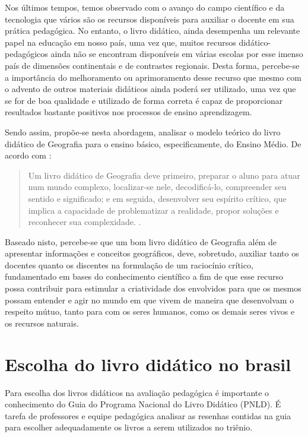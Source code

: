 \begin{refsection}
    Nos últimos tempos, temos observado com o avanço do campo científico e da tecnologia que vários são os recursos disponíveis para auxiliar o docente em sua prática pedagógica. No entanto, o livro didático, ainda desempenha um relevante papel na educação em nosso país, uma vez que, muitos recursos didático-pedagógicos ainda não se encontram disponíveis em várias escolas por esse imenso país de dimensões continentais e de contrastes regionais. Desta forma, percebe-se a importância do melhoramento ou aprimoramento desse recurso que mesmo com o advento de outros materiais didáticos ainda poderá ser utilizado, uma vez que se for de boa qualidade e utilizado de forma correta é capaz de proporcionar resultados bastante positivos nos processos de ensino aprendizagem.  

    Sendo assim, propõe-se nesta abordagem, analisar o modelo teórico do livro didático de Geografia para o ensino básico, especificamente, do Ensino Médio. De acordo com \textcite{HESPANHOL2006Avaliação}:
    
    \begin{quotation}
        Um livro didático de Geografia deve primeiro, preparar o aluno para atuar num mundo complexo, localizar-se nele, decodificá-lo, compreender seu sentido e significado; e em seguida, desenvolver seu espírito crítico, que implica a capacidade de problematizar a realidade, propor soluções e reconhecer sua complexidade. \cite[p.~77]{HESPANHOL2006Avaliação}. 
    \end{quotation}

    Baseado nisto, percebe-se que um bom livro didático de Geografia além de apresentar informações e conceitos geográficos, deve, sobretudo, auxiliar tanto os docentes quanto os discentes na formulação de um raciocínio crítico, fundamentado em bases do conhecimento científico a fim de que esse recurso possa contribuir para estimular a criatividade dos envolvidos para que os mesmos possam entender e agir no mundo em que vivem de maneira que desenvolvam o respeito mútuo, tanto para com os seres humanos, como os demais seres vivos e os recursos naturais.  


    \section{Escolha do livro didático no brasil}

    Para escolha dos livros didáticos na avaliação pedagógica é importante o conhecimento do Guia do Programa Nacional do Livro Didático (PNLD). É tarefa de professores e equipe pedagógica analisar as resenhas contidas na guia para escolher adequadamente os livros a serem utilizados no triênio.  


\end{refsection}
